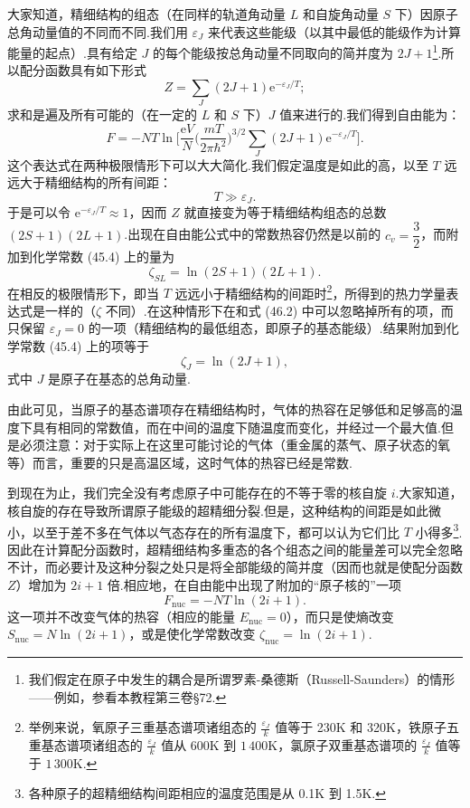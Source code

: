 大家知道，精细结构的组态（在同样的轨道角动量 $L$ 和自旋角动量 $S$ 下）因原子总角动量值的不同而不同.我们用 $\varepsilon_J$ 来代表这些能级（以其中最低的能级作为计算能量的起点）.具有给定 $J$ 的每个能级按总角动量不同取向的简并度为 $2J+1$\footnote{我们假定在原子中发生的耦合是所谓罗素-桑德斯（Russell-Saunders）的情形——例如，参看本教程第三卷§72.}.所以配分函数具有如下形式
\begin{equation}
  Z=\sum_J\left(2J+1\right)\mathrm{e}^{-\varepsilon_J/T};
\end{equation}
求和是遍及所有可能的（在一定的 $L$ 和 $S$ 下）$J$ 值来进行的.我们得到自由能为：
\begin{equation}
  F=-NT\ln\Big[\frac{\mathrm{e}V}{N}\Big(\frac{mT}{2\pi\hbar^2}\Big)^{3/2}
  \sum_J\left(2J+1\right)\mathrm{e}^{-\varepsilon_J/T}\Big].
\end{equation}
这个表达式在两种极限情形下可以大大简化.我们假定温度是如此的高，以至 $T$ 远远大于精细结构的所有间距：
\begin{equation*}
  T\gg\varepsilon_J.
\end{equation*}
于是可以令 $\mathrm{e}^{-\varepsilon_J/T}\approx1$，因而 $Z$ 就直接变为等于精细结构组态的总数 $(2S+1)(2L+1)$.出现在自由能公式中的常数热容仍然是以前的 $c_v=\dfrac{3}{2}$，而附加到化学常数 (45.4) 上的量为
\begin{equation}
  \zeta_{SL}=\ln\left(2S+1\right)\left(2L+1\right).
\end{equation}
在相反的极限情形下，即当 $T$ 远远小于精细结构的间距时\footnote{举例来说，氧原子三重基态谱项诸组态的 $\frac{\varepsilon_J}{k}$ 值等于 230K 和 320K，铁原子五重基态谱项诸组态的 $\frac{\varepsilon_J}{k}$ 值从 600K 到 $1\,400$K，氯原子双重基态谱项的 $\frac{\varepsilon_J}{k}$ 值等于 $1\,300$K.}，所得到的热力学量表达式是一样的（$\zeta$ 不同）.在这种情形下在和式 (46.2) 中可以忽略掉所有的项，而只保留 $\varepsilon_J=0$ 的一项（精细结构的最低组态，即原子的基态能级）.结果附加到化学常数 (45.4) 上的项等于
\begin{equation}
  \zeta_J=\ln\left(2J+1\right),
\end{equation}
式中 $J$ 是原子在基态的总角动量.

由此可见，当原子的基态谱项存在精细结构时，气体的热容在足够低和足够高的温度下具有相同的常数值，而在中间的温度下随温度而变化，并经过一个最大值.但是必须注意：对于实际上在这里可能讨论的气体（重金属的蒸气、原子状态的氧等）而言，重要的只是高温区域，这时气体的热容已经是常数.

到现在为止，我们完全没有考虑原子中可能存在的不等于零的核自旋 $i$.大家知道，核自旋的存在导致所谓原子能级的超精细分裂.但是，这种结构的间距是如此微小，以至于差不多在气体以气态存在的所有温度下，都可以认为它们比 $T$ 小得多\footnote{各种原子的超精细结构间距相应的温度范围是从 0.1K 到 1.5K.}.因此在计算配分函数时，超精细结构多重态的各个组态之间的能量差可以完全忽略不计，而必要计及这种分裂之处只是将全部能级的简并度（因而也就是使配分函数 $Z$）增加为 $2i+1$ 倍.相应地，在自由能中出现了附加的“原子核的”一项
\begin{equation}
  F_{\mathrm{nuc}}=-NT\ln\left(2i+1\right).
\end{equation}
这一项并不改变气体的热容（相应的能量 $E_{\mathrm{nuc}}=0$），而只是使熵改变 $S_{\mathrm{nuc}}=N\ln(2i+1)$，或是使化学常数改变 $\zeta_{\mathrm{nuc}}=\ln(2i+1)$.

